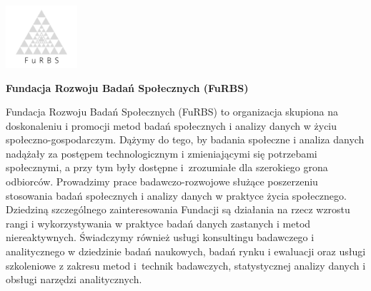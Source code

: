 \documentclass[\main/boa.tex]{subfiles}
\begin{document}
	
	\begin{minipage}[t]{0.915\textwidth}
		\center     
		\includegraphics[width=100px]{img/logos.bw/furbs.png} 
	\end{minipage}
	\begin{center}
	\Large \textbf {Fundacja Rozwoju Badań Społecznych (FuRBS)}
	\end{center}
	
	\vskip 0.3cm
	\normalsize 
	Fundacja Rozwoju Badań Społecznych (FuRBS) to organizacja skupiona na doskonaleniu i promocji metod badań społecznych i analizy danych w życiu społeczno-gospodarczym. Dążymy do tego, by badania społeczne i analiza danych nadążały za postępem technologicznym i zmieniającymi się potrzebami społecznymi, a przy tym były dostępne i~zrozumiałe dla szerokiego grona odbiorców. Prowadzimy prace badawczo-rozwojowe służące poszerzeniu stosowania badań społecznych i analizy danych w praktyce życia społecznego. Dziedziną szczególnego zainteresowania Fundacji są działania na rzecz wzrostu rangi i wykorzystywania w praktyce badań danych zastanych i metod niereaktywnych. Świadczymy również usługi konsultingu badawczego i analitycznego w dziedzinie badań naukowych, badań rynku i ewaluacji oraz usługi szkoleniowe z zakresu metod i~technik badawczych, statystycznej analizy danych i obsługi narzędzi analitycznych.
	
	\vskip 1.5cm
\end{document}
